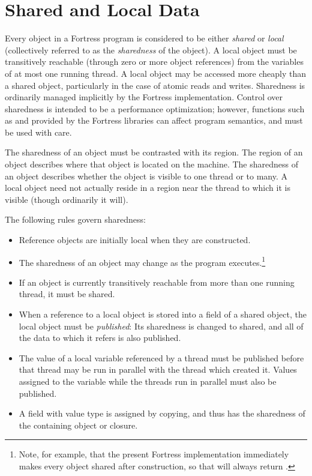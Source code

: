 %
%
%
%

\section{Shared and Local Data}


Every object in a Fortress program is considered to be either
\emph{shared} or \emph{local} (collectively referred to as the
\emph{sharedness} of the object).  A local object must be transitively
reachable (through zero or more object references) from the variables
of at most one running thread.  A local object may be accessed more
cheaply than a shared object, particularly in the case of atomic reads
and writes.  Sharedness is ordinarily managed implicitly by the
Fortress implementation.
Control over sharedness is intended to be a
performance optimization; however, functions such as  and
 provided by the Fortress libraries
can affect program semantics, and must be used with care.

The sharedness of an object must be contrasted with its region.  The
region of an object describes where that object is located on the
machine.  The sharedness of an object describes whether the object is
visible to one thread or to many.  A local object need not actually
reside in a region near the thread to which it is visible (though
ordinarily it will).

The following rules govern sharedness:
\begin{itemize}
\item Reference objects are initially local when they are constructed.
\item The sharedness of an object may change as the program executes.\footnote{Note, for example, that the present Fortress implementation immediately makes every object shared after construction, so that  will always return .}
\item If an object is currently transitively reachable from more than
  one running thread, it must be shared.
\item When a reference to a local object is stored into a field of a
  shared object, the local object must be \emph{published}: Its
  sharedness is changed to shared, and all of the data to which it
  refers is also published.
\item The value of a local variable referenced by a thread must be
  published before that thread may be run in parallel with the thread
  which created it.  Values assigned to the variable while the
  threads run in parallel must also be published.
\item A field with value type is assigned by copying, and thus has the
   sharedness of the containing object or closure.
\end{itemize}

